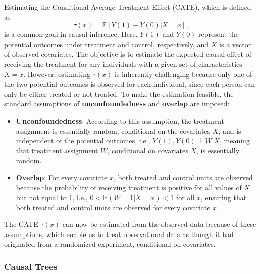 \documentclass[
  12pt,
  a4paper,
  oneside]{article}
\begin{document}
Estimating the Conditional Average Treatment Effect (CATE), which is
defined as \begin{equation} \label{eq:1}
\tau(x) = \mathbb{E}[Y(1) - Y(0) | X = x],
\end{equation} is a common goal in causal inference. Here, \(Y(1)\) and
\(Y(0)\) represent the potential outcomes under treatment and control,
respectively, and \(X\) is a vector of observed covariates. The
objective is to estimate the expected causal effect of receiving the
treatment for any individuals with a given set of characteristics
\(X = x\). However, estimating \(\tau(x)\) is inherently challenging
because only one of the two potential outcomes is observed for each
individual, since each person can only be either treated or not treated.
To make the estimation feasible, the standard assumptions of
\textbf{unconfoundedness} and \textbf{overlap} are imposed:

\begin{itemize}
\item
  \textbf{Unconfoundedness}: According to this assumption, the treatment
  assignment is essentially random, conditional on the covariates \(X\),
  and is independent of the potential outcomes, i.e.,
  \(Y(1), Y(0) \perp W | X\), meaning that treatment assignment \(W\),
  conditional on covariates \(X\), is essentially random.
\item
  \textbf{Overlap}: For every covariate \(x\), both treated and control
  units are observed because the probability of receiving treatment is
  positive for all values of \(X\) but not equal to 1, i.e.,
  \(0 < \mathbb{P}(W = 1 | X = x) < 1\) for all \(x\), ensuring that
  both treated and control units are observed for every covariate \(x\).
\end{itemize}

The CATE \(\tau(x)\) can now be estimated from the observed data because
of these assumptions, which enable us to treat observational data as
though it had originated from a randomized experiment, conditional on
covariates.

\subsubsection{Causal Trees}\label{causal-trees}
\end{document}
